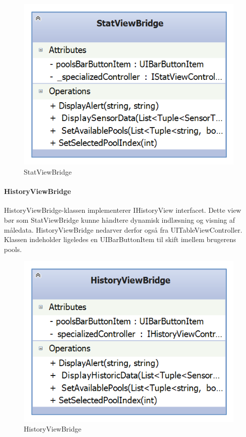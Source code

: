 \begin{figure}
	\centering
	\includegraphics[width=0.3\linewidth]{figs/design/ios_statviewbridge}
	\caption{StatViewBridge}
	\label{fig:ios_statviewbridge}
\end{figure}

\paragraph{HistoryViewBridge}
HistoryViewBridge-klassen implementerer IHistoryView interfacet. Dette view bør som StatViewBridge kunne håndtere dynamisk indlæsning og visning af måledata. HistoryViewBridge nedarver derfor også fra UITableViewController. Klassen indeholder ligeledes en UIBarButtonItem til skift imellem brugerens pools.

\begin{figure}
	\centering
	\includegraphics[width=0.3\linewidth]{figs/design/ios_historyviewbridge}
	\caption{HistoryViewBridge}
	\label{fig:ios_historyviewbridge}
\end{figure}